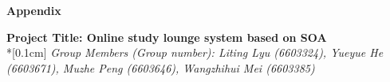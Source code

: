 \documentclass[runningheads]{llncs}
\begin{document}

\begin{flushleft}
\huge{\textbf{Appendix}}
\end{flushleft}
\begin{center}
\Large{\textbf{Project Title:  Online study lounge system based on SOA }} \\*[0.1cm]%
\large{\emph{Group Members (Group number): Liting Lyu (6603324), Yueyue  He (6603671), Muzhe Peng (6603646), Wangzhihui Mei (6603385)}} %
\end{center}


\noindent 
\end{document}
